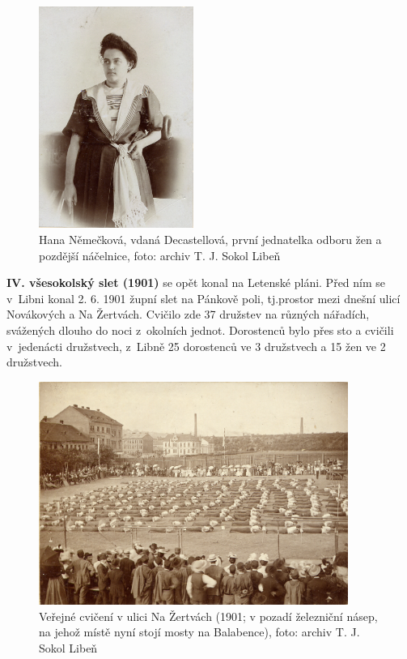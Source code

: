 \documentclass[a5paper, 11pt, twoside]{article}
\begin{document}
\begin{figure}[h!]
  \centering
  \includegraphics[width=0.45\textwidth]{img/11_hana_decastellova.jpg}
  \caption*{Hana Němečková, vdaná Decastellová, první jednatelka odboru žen a pozdější náčelnice, foto: archiv T. J. Sokol Libeň}
\end{figure}

\textbf{IV. všesokolský slet (1901)} se opět konal na Letenské pláni. Před ním se v~Libni konal 2. 6. 1901 župní slet na Pánkově poli, tj.prostor mezi dnešní ulicí Novákových a Na Žertvách. Cvičilo zde 37 družstev na různých nářadích, svážených dlouho do noci z~okolních jednot. Dorostenců bylo přes sto a cvičili v~jedenácti družstvech, z~Libně 25 dorostenců ve 3 družstvech a 15 žen ve 2 družstvech.

\begin{figure}[hp]
  \centering
  \includegraphics[width=0.9\textwidth]{img/12_na_zertvach.jpg}
  \caption*{Veřejné cvičení v ulici Na Žertvách (1901; v pozadí železniční násep, na jehož místě nyní stojí mosty na Balabence), foto: archiv T. J. Sokol Libeň}
\end{figure}
\end{document}
